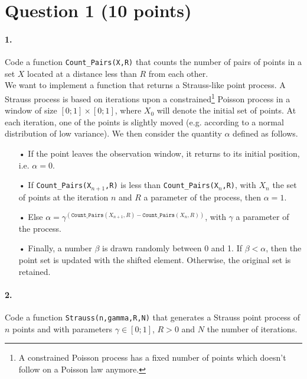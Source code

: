 \documentclass{article}
\begin{document}
\section{Question 1 (10 points)}


\paragraph{1.} Code a function \texttt{Count\_Pairs(X,R)} that counts the number of pairs of points in a set $X$ located at a distance less than $R$ from each other.\\

We want to implement a function that returns a Strauss-like point process. A Strauss process is based on iterations upon a constrained\footnote{A constrained Poisson process has a fixed number of points which doesn't follow on a Poisson law anymore.} Poisson process in a window of size $[0;1]\times[0;1]$, where $X_0$ will denote the initial set of points. At each iteration, one of the points is slightly moved (e.g. according to a normal distribution of low variance). We then consider the quantity $\alpha$ defined as follows.

\begin{enumerate}
\item[•] If the point leaves the observation window, it returns to its initial position, i.e. $\alpha=0$.
\item[•] If \texttt{Count\_Pairs(X$_{n+1}$,R)} is less than \texttt{Count\_Pairs(X$_{n}$,R)}, with $X_n$ the set of points at the iteration $n$ and $R$ a parameter of the process, then $\alpha=1$.
\item[•] Else $\alpha =\gamma^{\left(\texttt{Count\_Pairs}(X_{n+1},R)-\texttt{Count\_Pairs}(X_{n},R)\right)}$, with $\gamma$ a parameter of the process.
\item[•] Finally, a number $\beta$ is drawn randomly between 0 and 1. If $\beta<\alpha$, then the point set is updated with the shifted element. Otherwise, the original set is retained.
\end{enumerate}

\paragraph{2.} Code a function \texttt{Strauss(n,gamma,R,N)} that generates a Strauss point process of $n$ points and with parameters $\gamma\in[0;1]$, $R>0$ and $N$ the number of iterations.
\end{document}
